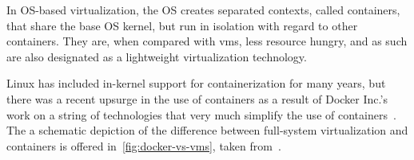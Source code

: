 In OS-based virtualization, the OS creates separated contexts, called containers, that share the base OS kernel, but run in isolation with regard to other containers.
They are, when compared with \glspl{vm}, less resource hungry, and as such are also designated as a lightweight virtualization technology.

Linux has included in-kernel support for containerization for many years, but there was a recent upsurge in the use of containers as a result of Docker Inc.'s work on a string of technologies that very much simplify the use of containers~\cite{hwswvirt,virtessentials}.
The a schematic depiction of the difference between full-system virtualization and containers is offered in~\ref{fig:docker-vs-vms}, taken from~\cite{dockercontreplacingvms}.







